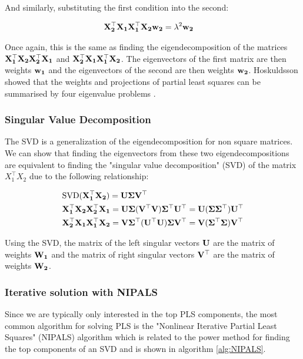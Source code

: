 And similarly, substituting the first condition into the second:

\begin{align}
    & \bold{X_2^{\top}X_1X_1^{\top}X_2w_2}=\lambda^2\bold{w_2}
\end{align}

Once again, this is the same as finding the eigendecomposition of the matrices $\bold{X_1^{\top}X_2X_2^{\top}X_1}$ and $\bold{X_2^{\top}X_1X_1^{\top}X_2}$. The eigenvectors of the first matrix are then weights $\bold{w_1}$ and the eigenvectors of the second are then weights $\bold{w_2}$. Hoskuldsson showed that the weights and projections of partial least squares can be summarised by four eigenvalue problems \cite{hoskuldsson1988pls}.

\subsubsection{Singular Value Decomposition}

The SVD is a generalization of the eigendecomposition for non square matrices. We can show that finding the eigenvectors from these two eigendecompositions are equivalent to finding the "singular value decomposition" (SVD) of the matrix $X_1^{\top}X_2$ due to the following relationship:

\begin{align}
    & \text{SVD}(\bold{X_1^{\top}X_2})=\bold{U\Sigma V^{\top}} \\
    & \bold{X_1^{\top}X_2X_2^{\top}X_1}=\bold{U\Sigma (V^{\top} V) \Sigma^{\top} U^{\top}=U(\Sigma \Sigma^{\top}) U^{\top}}\\
    & \bold{X_2^{\top}X_1X_1^{\top}X_2}=\bold{V\Sigma^{\top} (U^{\top} U) \Sigma V^{\top}=V(\Sigma^{\top} \Sigma) V^{\top}}
\end{align}

Using the SVD, the matrix of the left singular vectors $\bold{U}$ are the matrix of weights $\bold{W_1}$ and the matrix of right singular vectors $\bold{V^{\top}}$ are the matrix of weights $\bold{W_2}$. 

\subsubsection{Iterative solution with NIPALS}

Since we are typically only interested in the top PLS components, the most common algorithm for solving PLS is the "Nonlinear Iterative Partial Least Squares" (NIPALS) algorithm \cite{wold1966estimation} 
which is related to the power method for finding the top components of an SVD and is shown in algorithm \ref{alg:NIPALS}. 

